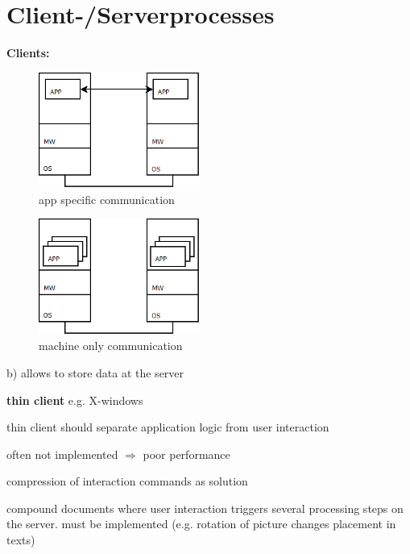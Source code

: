 \section{Client-/Serverprocesses}
\textbf{Clients:}\\
\begin{figure}[h]
	\centering
	\includegraphics[width=200px]{gfx/clienta.png}
	\caption{app specific communication}
	\label{img:clienta}
\end{figure}
\begin{figure}[h]
	\centering
	\includegraphics[width=200px]{gfx/clientb.png}
	\caption{machine only communication}
	\label{img:clientb}
\end{figure}

\begin{compactitem}
\item b) allows to store data at the server
\item \textbf{thin client} e.g. X-windows
\item thin client should separate application logic from user interaction
\item often not implemented $\Rightarrow$ poor performance
\item compression of interaction commands as solution
\item compound documents where user interaction triggers several processing steps on the server. must be implemented (e.g. rotation of picture changes placement in texts)
\end{compactitem}

